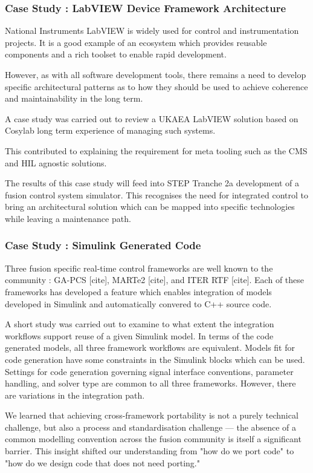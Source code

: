 \documentclass[preprint]{elsarticle}
\begin{document}
\subsubsection{Case Study : LabVIEW Device Framework Architecture}

National Instruments LabVIEW is widely used for control and instrumentation projects.
It is a good example of an ecosystem which provides reusable components and a rich 
toolset to enable rapid development.   

However, as with all software development tools, there remains a need to develop
specific architectural patterns as to how they should be used to achieve coherence
and maintainability in the long term.

A case study was carried out to review a UKAEA LabVIEW solution based on Cosylab
long term experience of managing such systems.   

This contributed to explaining the requirement for meta tooling such as the CMS
and HIL agnostic solutions.

The results of this case study will feed into STEP Tranche 2a development of 
a fusion control system simulator.  This recognises the need for integrated
control to bring an architectural solution which can be mapped into 
specific technologies while leaving a maintenance path.

\subsubsection{Case Study : Simulink Generated Code}

Three fusion specific real-time control frameworks are well known to the community :
GA-PCS [cite], MARTe2 [cite], and ITER RTF [cite].  Each of these frameworks has
developed a feature which enables integration of models developed in Simulink 
and automatically convered to C++ source code.

A short study was carried out to examine to what extent the integration workflows
support reuse of a given Simulink model.  In terms of the code generated models,
all three framework workflows are equivalent.  Models fit for code generation 
have some constraints in the Simulink blocks which can be used.  Settings for code generation
governing signal interface conventions, parameter handling, and solver type
are common to all three frameworks.  However, there are variations in the integration path.

We learned that achieving cross-framework portability is not a purely technical challenge, but also a process and standardisation challenge — the absence of a common modelling convention across the fusion community is itself a significant barrier. This insight shifted our understanding from "how do we port code" to "how do we design code that does not need porting."
\end{document}
